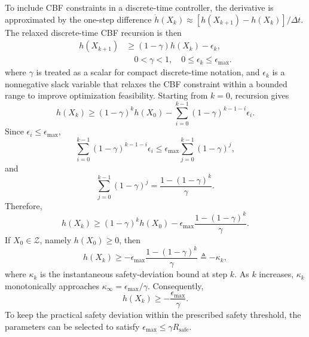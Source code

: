 \documentclass[journal]{IEEEtranTIE}
\begin{document}
    To include CBF constraints in a discrete-time controller, the derivative is
    approximated by the one-step difference
    $\dot{h}(X_k)\approx[h(X_{k+1})-h(X_k)]/\Delta t$. The relaxed discrete-time
    CBF recursion is then
    \begin{equation}
    \begin{aligned}
    h(X_{k+1})
    &\ge(1-\gamma)h(X_k)-\epsilon_k,\\
    &\quad 0<\gamma<1,\quad 0\le\epsilon_k\le\epsilon_{\max}.
    \end{aligned}
    \end{equation}
    where $\gamma$ is treated as a scalar for compact discrete-time notation, and
    $\epsilon_k$ is a nonnegative slack variable that relaxes the CBF constraint
    within a bounded range to improve optimization feasibility. Starting from
    $k=0$, recursion gives
    \begin{equation}
    h(X_k)\ge
    (1-\gamma)^kh(X_0)
    -
    \sum_{i=0}^{k-1}(1-\gamma)^{k-1-i}\epsilon_i.
    \end{equation}
    Since $\epsilon_i\le\epsilon_{\max}$,
    \begin{equation}
    \sum_{i=0}^{k-1}(1-\gamma)^{k-1-i}\epsilon_i
    \le
    \epsilon_{\max}\sum_{j=0}^{k-1}(1-\gamma)^j,
    \end{equation}
    and
    \begin{equation}
    \sum_{j=0}^{k-1}(1-\gamma)^j
    =
    \frac{1-(1-\gamma)^k}{\gamma}.
    \end{equation}
    Therefore,
    \begin{equation}
    h(X_k)\ge
    (1-\gamma)^kh(X_0)
    -
    \epsilon_{\max}
    \frac{1-(1-\gamma)^k}{\gamma}.
    \end{equation}
    If $X_0\in\mathcal{Z}$, namely $h(X_0)\ge0$, then
    \begin{equation}
    h(X_k)\ge
    -\epsilon_{\max}
    \frac{1-(1-\gamma)^k}{\gamma}
    \triangleq -\kappa_k,
    \end{equation}
    where $\kappa_k$ is the instantaneous safety-deviation bound at step $k$. As
    $k$ increases, $\kappa_k$ monotonically approaches
    $\kappa_\infty=\epsilon_{\max}/\gamma$. Consequently,
    \begin{equation}
    h(X_k)\ge-\frac{\epsilon_{\max}}{\gamma}.
    \end{equation}
    To keep the practical safety deviation within the prescribed safety
    threshold, the parameters can be selected to satisfy
    $\epsilon_{\max}\le\gamma R_{\mathrm{safe}}$.
\end{document}
